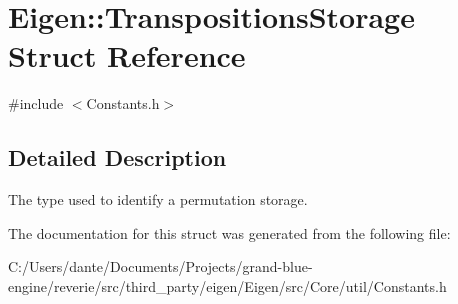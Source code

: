 \hypertarget{struct_eigen_1_1_transpositions_storage}{}\section{Eigen\+::Transpositions\+Storage Struct Reference}
\label{struct_eigen_1_1_transpositions_storage}


{\ttfamily \#include $<$Constants.\+h$>$}



\subsection{Detailed Description}
The type used to identify a permutation storage. 

The documentation for this struct was generated from the following file\+:\begin{DoxyCompactItemize}
\item 
C\+:/\+Users/dante/\+Documents/\+Projects/grand-\/blue-\/engine/reverie/src/third\+\_\+party/eigen/\+Eigen/src/\+Core/util/Constants.\+h\end{DoxyCompactItemize}
